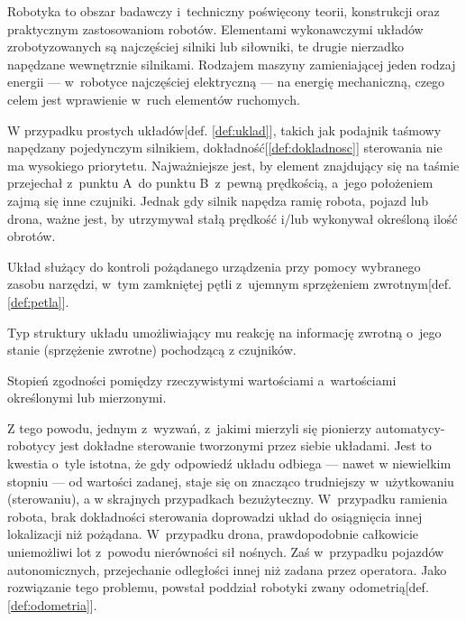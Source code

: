\label{ch:wstep}

Robotyka to obszar badawczy i~techniczny poświęcony teorii, konstrukcji oraz praktycznym zastosowaniom robotów. Elementami wykonawczymi układów zrobotyzowanych są najczęściej silniki lub siłowniki, te drugie nierzadko napędzane wewnętrznie silnikami. Rodzajem maszyny zamieniającej jeden rodzaj energii --- w~robotyce najczęściej elektryczną --- na energię mechaniczną, czego celem jest wprawienie w~ruch elementów ruchomych.

W przypadku prostych układów[def. \ref{def:uklad}], takich jak podajnik taśmowy napędzany pojedynczym silnikiem, dokładność[\ref{def:dokladnosc}] sterowania nie ma wysokiego priorytetu. Najważniejsze jest, by element znajdujący się na taśmie przejechał z~punktu A~do punktu B~z~pewną prędkością, a~jego położeniem zajmą się inne czujniki. Jednak gdy silnik napędza ramię robota, pojazd lub drona, ważne jest, by utrzymywał stałą prędkość i/lub wykonywał określoną ilość obrotów.

\begin{Definition}\label{def:uklad}
   Układ służący do kontroli pożądanego urządzenia przy pomocy wybranego zasobu narzędzi, w~tym zamkniętej pętli z~ujemnym sprzężeniem zwrotnym[def. \ref{def:petla}].
\end{Definition}

\begin{Definition}[Pętla]\label{def:petla}
    Typ struktury układu umożliwiający mu reakcję na informację zwrotną o~jego stanie (sprzężenie zwrotne) pochodzącą z czujników.
\end{Definition}

\begin{Definition}[Dokładność]\label{def:dokladnosc}
    Stopień zgodności pomiędzy rzeczywistymi wartościami a~wartościami określonymi lub mierzonymi.
\end{Definition}

Z tego powodu, jednym z~wyzwań, z~jakimi mierzyli się pionierzy automatycy-robotycy jest dokładne sterowanie tworzonymi przez siebie układami. Jest to kwestia o~tyle istotna, że gdy odpowiedź układu odbiega --- nawet w niewielkim stopniu --- od wartości zadanej, staje się on znacząco trudniejszy w~użytkowaniu (sterowaniu), a w skrajnych przypadkach bezużyteczny. W~przypadku ramienia robota, brak dokładności sterowania doprowadzi układ do osiągnięcia innej lokalizacji niż pożądana. W~przypadku drona, prawdopodobnie całkowicie uniemożliwi lot z~powodu nierówności sił nośnych. Zaś w~przypadku pojazdów autonomicznych, przejechanie odległości innej niż zadana przez operatora. Jako rozwiązanie tego problemu, powstał poddział robotyki zwany odometrią[def. \ref{def:odometria}]. 

